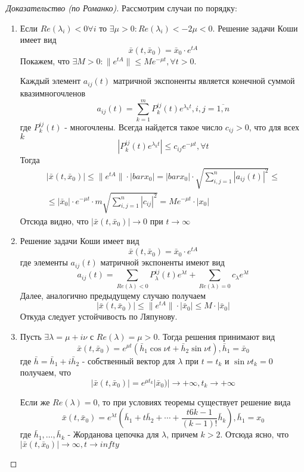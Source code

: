 \begin{proof}[Доказательство (по Романко)]
	Рассмотрим случаи по порядку:
	\begin{enumerate}
		\item Если $Re(\lambda_i)<0 \forall i$ то $\exists \mu >0 : Re(\lambda_i)< -2\mu < 0$. Решение задачи Коши имеет вид 
		\[
			\bar{x}(t, \bar{x}_0) = \bar{x}_0\cdot e^{tA}
		\]
		Покажем, что $\exists M>0: \|e^{tA}\| \leqslant Me^{-\mu t}, \forall t>0$.
		
		Каждый элемент $a_{ij}(t)$ матричной экспоненты является конечной суммой квазимногочленов
		\[
			a_{ij}(t) = \sum_{k=1}^m P_k^{ij}(t)e^{\lambda_kt}, i,j=\overline{1,n}
		\]
		где $P_k^{ij}(t)$ - многочлены. Всегда найдется такое число $c_{ij}>0$, что для всех $k$
		\[
			|P_k^{ij}(t)e^{\lambda_kt}|\leqslant c_{ij}e^{-\mu t}, \forall t
		\]
		Тогда
		\begin{multline*}
		|\bar{x}(t, \bar{x}_0)|\leqslant \|e^{tA}\|\cdot|bar{x}_0| = |bar{x}_0|\cdot\sqrt{\sum_{i,j=1}^n|a_{ij}(t)|^2}\leqslant\\\leqslant|\bar{x}_0|\cdot e^{-\mu t}\cdot m \sqrt{\sum_{i,j=1}^n|c_{ij}|^2} = Me^{-\mu t}\cdot |x_0|
		\end{multline*}
		Отсюда видно, что $|\bar{x}(t, \bar{x}_0)| \to 0$ при $t \to \infty$
	\item 
		Решение задачи Коши имеет вид 
		\[
		\bar{x}(t, \bar{x}_0) = \bar{x}_0\cdot e^{tA}
		\]
		где элементы $a_{ij}(t)$ матричной экспоненты имеют вид
		\[
			a_{ij}(t) = \sum_{Re(\lambda) < 0}P_\lambda^{ij}(t)e^{\lambda t} + \sum_{Re(\lambda)=0}c_\lambda e^{\lambda t}
		\]
		Далее, аналогично предыдущему случаю получаем
		\[
			|\bar{x}(t, \bar{x}_0)| \leqslant \|e^{tA}\|\cdot|\bar{x}_0| \leqslant M\cdot|\bar{x}_0| 
		\]
		Откуда следует устойчивость по Ляпунову.
	\item
		Пусть $\exists \lambda = \mu + i \nu$ с $Re(\lambda) = \mu >0$. Тогда решения принимают вид
		\[
			\bar{x}(t, \bar{x}_0) = e^{\mu t}(\bar{h}_1\cos{\nu t}+ \bar{h}_2\sin{\nu t}), \bar{h}_1 = \bar{x}_0
		\]
		где $\bar{h} = \bar{h}_1 + i\bar{h}_2$ - собственный вектор для $\lambda$ при $t = t_k$ и $\sin{\nu t_k} = 0$ получаем, что
		\[
			|\bar{x}(t, \bar{x}_0)| = e^{\mu t_k}|\bar{x}_0)| \to +\infty, t_k\to+\infty
		\]
		
		Если же $Re(\lambda) = 0$, то при условиях теоремы существует решение вида
		\[
			\bar{x}(t, \bar{x}_0) = e^{\lambda t}\left( \bar{h}_1 + t\bar{h}_2 + \cdots + \frac{t6{k-1}}{(k-1)!}\bar{h}_k\right), \bar{h}_1=x_0
		\]
		где $\bar{h}_1, \dots,\bar{h}_k$ - Жорданова цепочка для $\lambda$, причем $k>2$. Отсюда ясно, что $|\bar{x}(t, \bar{x}_0)| \to \infty, t\to infty$
		
	\end{enumerate}
\end{proof}























